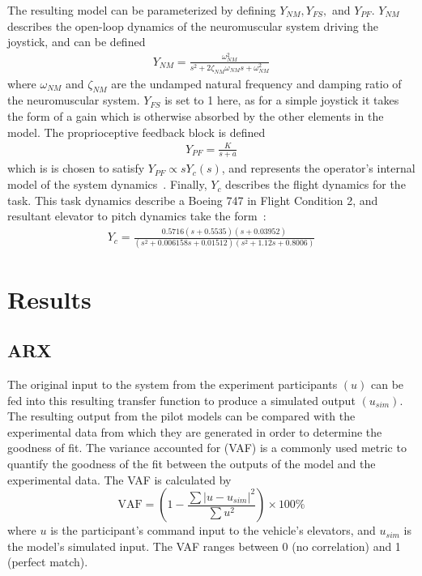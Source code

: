 The resulting model can be parameterized by defining $Y_{NM}, Y_{FS},$ and $Y_{PF}$.
$Y_{NM}$ describes the open-loop dynamics of the neuromuscular system driving the joystick, and can be defined
\begin{align}
    Y_{NM} = \frac{\omega^2_{NM}}{s^2 + 2 \zeta_{NM} \omega_{NM} s + \omega^2_{NM}}
\end{align}
where $\omega_{NM}$ and $\zeta_{NM}$ are the undamped natural frequency and damping ratio of the neuromuscular system.
$Y_{FS}$ is set to 1 here, as for a simple joystick it takes the form of a gain which is otherwise absorbed by the other elements in the model.
The proprioceptive feedback block is defined
\begin{align} \label{eq:ypf}
    Y_{PF} = \frac{K}{s+a}
\end{align}
which is is chosen to satisfy $Y_{PF} \propto s Y_c (s)$, and represents the operator's internal model of the system dynamics~\citep{hess_unified_1997}.
Finally, $Y_c$ describes the flight dynamics for the task.
This task dynamics describe a Boeing 747 in Flight Condition 2, and resultant elevator to pitch dynamics take the form~\citep{heffley1972aircraft}:
\begin{align}
    Y_c = \frac{0.5716 (s+0.5535) (s+0.03952)}{(s^2 + 0.006158s + 0.01512) (s^2 + 1.12s + 0.8006)}
\end{align}

\section{Results}

\subsection{ARX}
The original input to the system from the experiment participants $(u)$ can be fed into this resulting transfer function to produce a simulated output $(u_{sim})$.
The resulting output from the pilot models can be compared with the experimental data from which they are generated in order to determine the goodness of fit.
The variance accounted for (VAF) is a commonly used metric to quantify the goodness of the fit between the outputs of the model and the experimental data.
The VAF is calculated by
\begin{equation}
    \mbox{VAF} = \left( 1 - \dfrac{\sum{|u - u_{sim}|^2}} {\sum{u^2}} \right) \times \mbox{100\%}
\end{equation}
where $u$ is the participant's command input to the vehicle's elevators, and $u_{sim}$ is the model's simulated input.
The VAF ranges between 0 (no correlation) and 1 (perfect match).

